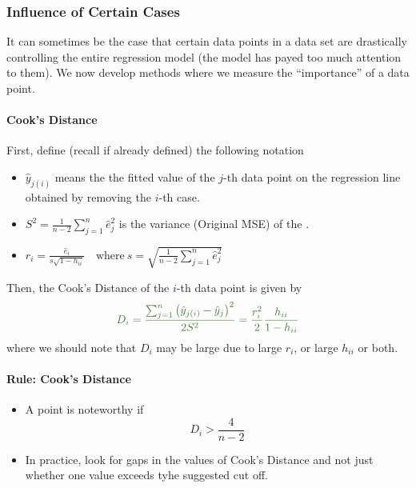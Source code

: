 \documentclass[10pt]{article}
\begin{document}
\subsubsection{Influence of Certain Cases}
It can sometimes be the case that certain data points in a data set are drastically controlling the entire regression model (the model has payed too much attention to them). We now develop methods where we measure the ``importance'' of a data point.

\paragraph{Cook's Distance} First, define (recall if already defined) the following notation
\begin{itemize}
    \item $\hat{{y}}_{j(i)}$ means the the fitted value of the $j$-th data point on the regression line obtained by removing the $i$-th case. 
    \item $S^2 = \frac{1}{n-2} \sum_{j=1}^n \hat{e}_j^2$ is the variance (Original MSE) of the \color{Thistle}{total regression model}. \color{black}
    \item $r_{i}=\frac{\hat{e}_{i}}{s \sqrt{1-h_{i i}}}\quad \text{where}~ s=\sqrt{\frac{1}{n-2} \sum_{j=1}^{n} \hat{e}_{j}^{2}}$
\end{itemize}
Then, the Cook's Distance of the $i$-th data point is given by
\begin{equation*}
    \color{OliveGreen}
    D_{i}=\frac{\sum_{j=1}^{n}\left(\hat{y}_{j(i)}-\hat{y}_{j}\right)^{2}}{2 S^{2}} = \frac{r_{i}^{2}}{2} \frac{h_{i i}}{1-h_{i i}}
\end{equation*}
where we should note that $D_i$ may be large due to large $r_i$, or large $h_{ii}$ or both.

\paragraph{Rule: Cook's Distance} 
\begin{itemize}
    \item A point is noteworthy if
        \begin{equation*}
            D_i > \frac{4}{n-2}
        \end{equation*}
    \item In practice, look for gaps in the values of Cook's Distance and not just whether one value exceeds tyhe suggested cut off.
\end{itemize}
\end{document}
